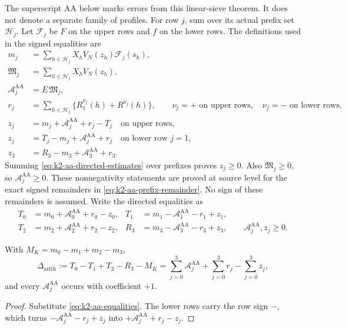 The superscript \(\mathrm{AA}\) below marks errors from this
linear-sieve theorem. It does not denote a separate family of profiles.
For row \(j\), sum over its actual prefix set \(\mathcal H_j\). Let
\(\mathcal F_j\) be \(F\) on the upper rows and \(f\) on the lower
rows. The definitions used in the signed equalities are
\begin{equation}\label{eq:k2-aa-row-definitions}
\begin{aligned}
 m_j&=\sum_{h\in\mathcal H_j}X_hV_N(z_h)\mathcal F_j(s_h),\\
 \mathfrak M_j&=\sum_{h\in\mathcal H_j}X_hV_N(z_h),\\
 \mathcal A_j^{\mathrm{AA}}&=\overline E\,\mathfrak M_j,\\
 r_j&=\sum_{h\in\mathcal H_j}\{R_1^{\nu_j}(h)+R^{\nu_j}(h)\},
 \qquad \nu_j=+\text{ on upper rows},\quad \nu_j=-\text{ on lower rows},\\
 z_j&=m_j+\mathcal A_j^{\mathrm{AA}}+r_j-T_j
       \quad\text{on upper rows},\\
 z_j&=T_j-m_j+\mathcal A_j^{\mathrm{AA}}+r_j
       \quad\text{on lower row }j=1,\\
 z_3&=R_3-m_3+\mathcal A_3^{\mathrm{AA}}+r_3.
\end{aligned}
\end{equation}
Summing \eqref{eq:k2-aa-directed-estimates} over prefixes proves
\(z_j\ge0\). Also \(\mathfrak M_j\ge0\), so
\(\mathcal A_j^{\mathrm{AA}}\ge0\). These nonnegativity
statements are proved at source level for the exact signed remainders in
\eqref{eq:k2-aa-prefix-remainder}. No sign of these remainders is assumed.
Write the directed equalities as
\begin{equation}\label{eq:k2-aa-equalities}
\begin{aligned}
 T_0&=m_0+\mathcal A_0^{\mathrm{AA}}+r_0-z_0,&
 T_1&=m_1-\mathcal A_1^{\mathrm{AA}}-r_1+z_1,\\
 T_2&=m_2+\mathcal A_2^{\mathrm{AA}}+r_2-z_2,&
 R_3&=m_3-\mathcal A_3^{\mathrm{AA}}-r_3+z_3,
 \qquad \mathcal A_j^{\mathrm{AA}},z_j\ge0.
\end{aligned}
\end{equation}
\begin{lemma}\label{lem:k2-row-identity}
With \(M_K=m_0-m_1+m_2-m_3\),
\[
 \Delta_{\mathrm{arith}}:=T_0-T_1+T_2-R_3-M_K
 =\sum_{j=0}^3\mathcal A_j^{\mathrm{AA}}+\sum_{j=0}^3r_j-\sum_{j=0}^3z_j,
\]
and every \(\mathcal A_j^{\mathrm{AA}}\) occurs with coefficient \(+1\).
\end{lemma}
\begin{proof}
Substitute \eqref{eq:k2-aa-equalities}. The lower rows carry the row
sign \(-\), which turns \(-\mathcal A_j^{\mathrm{AA}}-r_j+z_j\) into
\(+\mathcal A_j^{\mathrm{AA}}+r_j-z_j\).
\end{proof}
